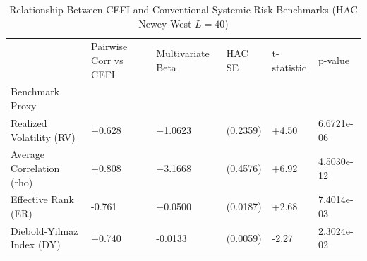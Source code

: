 \begin{table}
\caption{Relationship Between CEFI and Conventional Systemic Risk Benchmarks (HAC Newey-West $L=40$)}
\label{tab:benchmarks_h4}
\begin{tabular}{llllll}
\toprule
 & Pairwise Corr vs CEFI & Multivariate Beta & HAC SE & t-statistic & p-value \\
Benchmark Proxy &  &  &  &  &  \\
\midrule
Realized Volatility (RV) & +0.628 & +1.0623 & (0.2359) & +4.50 & 6.6721e-06 \\
Average Correlation (rho) & +0.808 & +3.1668 & (0.4576) & +6.92 & 4.5030e-12 \\
Effective Rank (ER) & -0.761 & +0.0500 & (0.0187) & +2.68 & 7.4014e-03 \\
Diebold-Yilmaz Index (DY) & +0.740 & -0.0133 & (0.0059) & -2.27 & 2.3024e-02 \\
\bottomrule
\end{tabular}
\end{table}
